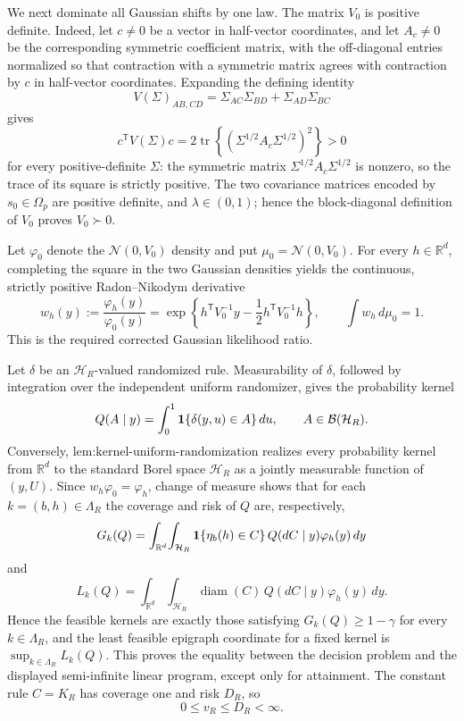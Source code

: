 We next dominate all Gaussian shifts by one law.  The matrix \(V_0\) is positive definite.  Indeed, let \(c\ne0\) be a vector in half-vector coordinates, and let \(A_c\ne0\) be the corresponding symmetric coefficient matrix, with the off-diagonal entries normalized so that contraction with a symmetric matrix agrees with contraction by \(c\) in half-vector coordinates.  Expanding the defining identity
\[
V(\Sigma)_{AB,CD}=\Sigma_{AC}\Sigma_{BD}+\Sigma_{AD}\Sigma_{BC}
\]
gives
\[
c^{\mathsf T}V(\Sigma)c
=2\operatorname{tr}\!\left\{(\Sigma^{1/2}A_c\Sigma^{1/2})^2\right\}>0
\]
for every positive-definite \(\Sigma\): the symmetric matrix \(\Sigma^{1/2}A_c\Sigma^{1/2}\) is nonzero, so the trace of its square is strictly positive.  The two covariance matrices encoded by \(s_0\in\Omega_p\) are positive definite, and \(\lambda\in(0,1)\); hence the block-diagonal definition of \(V_0\) proves \(V_0\succ0\).

Let \(\varphi_0\) denote the \(\mathcal N(0,V_0)\) density and put \(\mu_0=\mathcal N(0,V_0)\).  For every \(h\in\mathbb R^d\), completing the square in the two Gaussian densities yields the continuous, strictly positive Radon--Nikodym derivative
\[
w_h(y):=\frac{\varphi_h(y)}{\varphi_0(y)}
=\exp\!\left\{h^{\mathsf T}V_0^{-1}y
-\frac12 h^{\mathsf T}V_0^{-1}h\right\},
\qquad
\int w_h\,d\mu_0=1.
\]
This is the required corrected Gaussian likelihood ratio.

Let \(\delta\) be an \(\mathcal H_R\)-valued randomized rule.  Measurability of \(\delta\), followed by integration over the independent uniform randomizer, gives the probability kernel
\[
Q(A\mid y)=\int_0^1 {\bf1}\{\delta(y,u)\in A\}\,du,
\qquad A\in\mathcal B(\mathcal H_R).
\]
Conversely, \(\text{lem:kernel-uniform-randomization}\) realizes every probability kernel from \(\mathbb R^d\) to the standard Borel space \(\mathcal H_R\) as a jointly measurable function of \((y,U)\).  Since \(w_h\varphi_0=\varphi_h\), change of measure shows that for each \(k=(b,h)\in\Lambda_R\) the coverage and risk of \(Q\) are, respectively,
\[
G_k(Q)=\int_{\mathbb R^d}\!\int_{\mathcal H_R}
 {\bf1}\{\eta_b(h)\in C\}\,Q(dC\mid y)\varphi_h(y)\,dy
\]
and
\[
L_k(Q)=\int_{\mathbb R^d}\!\int_{\mathcal H_R}
 \operatorname{diam}(C)\,Q(dC\mid y)\varphi_h(y)\,dy.
\]
Hence the feasible kernels are exactly those satisfying \(G_k(Q)\ge1-\gamma\) for every \(k\in\Lambda_R\), and the least feasible epigraph coordinate for a fixed kernel is \(\sup_{k\in\Lambda_R}L_k(Q)\).  This proves the equality between the decision problem and the displayed semi-infinite linear program, except only for attainment.  The constant rule \(C=K_R\) has coverage one and risk \(D_R\), so
\[
0\le v_R\le D_R<\infty.
\]

